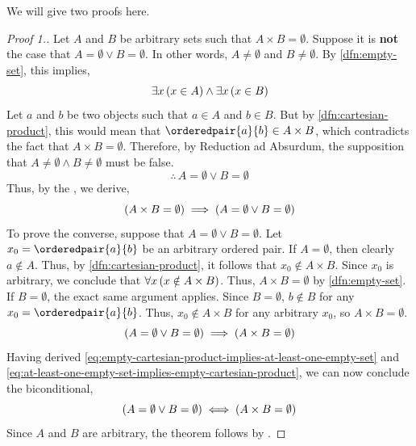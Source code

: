 \noindent We will give two proofs here.
\begin{proof}[Proof 1.]
    Let \( A \) and \( B \) be arbitrary sets such that \( A \times B = \emptyset \). Suppose it is {\bfseries not}
    the case that \( A = \emptyset \lor B = \emptyset \). In other words, \( A \neq \emptyset \) and
    \( B \neq \emptyset \). By \cref{dfn:empty-set}, this implies,
    \begin{equation*}
        \exists x \, \mleft( x \in A \mright)
        \land
        \exists x \, \mleft( x \in B \mright)
    \end{equation*}
    Let \( a \) and \( b \) be two objects such that \( a \in A \) and \( b \in B \). But by \cref{dfn:cartesian-product},
    this would mean that \( \orderedpair{a}{b} \in A \times B \), which contradicts the fact that \( A \times B = \emptyset \).
    Therefore, by Reduction ad Absurdum, the supposition that \( A \neq \emptyset \land B \neq \emptyset \) must be
    false.
    \begin{equation*}
        \therefore \, A = \emptyset \lor B = \emptyset
    \end{equation*}
    Thus, by the , we derive,
    \begin{equation}
        \label{eq:empty-cartesian-product-implies-at-least-one-empty-set}
        \mleft( A \times B = \emptyset \mright) \implies \mleft( A = \emptyset \lor B = \emptyset \mright)
    \end{equation}
    To prove the converse, suppose that \( A = \emptyset \lor B = \emptyset \).
    Let \( x_{0} = \orderedpair{a}{b} \) be an arbitrary ordered pair.
    If \( A = \emptyset \), then clearly \( a \notin A \). Thus, by \cref{dfn:cartesian-product},
    it follows that \( x_{0} \notin A \times B \). Since \( x_{0} \) is arbitrary,
    we conclude that \( \forall x \, \mleft( x \notin A \times B \mright) \). Thus, \( A \times B = \emptyset \)
    by \cref{dfn:empty-set}. If \( B = \emptyset \), the exact same argument applies. Since \( B = \emptyset \),
    \( b \notin B \) for any \( x_{0} = \orderedpair{a}{b} \). Thus, \( x_{0} \notin A \times B \) for any arbitrary
    \( x_{0} \), so \( A \times B = \emptyset \).
    \begin{equation}
        \label{eq:at-least-one-empty-set-implies-empty-cartesian-product}
        \mleft( A = \emptyset \lor B = \emptyset \mright)
        \implies
        \mleft( A \times B = \emptyset \mright)
    \end{equation}
    Having derived \eqref{eq:empty-cartesian-product-implies-at-least-one-empty-set} and \eqref{eq:at-least-one-empty-set-implies-empty-cartesian-product},
    we can now conclude the biconditional,
    \begin{equation*}
        \mleft( A = \emptyset \lor B = \emptyset \mright)
        \iff
        \mleft( A \times B = \emptyset \mright)
    \end{equation*}
    Since \( A \) and \( B \) are arbitrary, the theorem follows by .
\end{proof}

